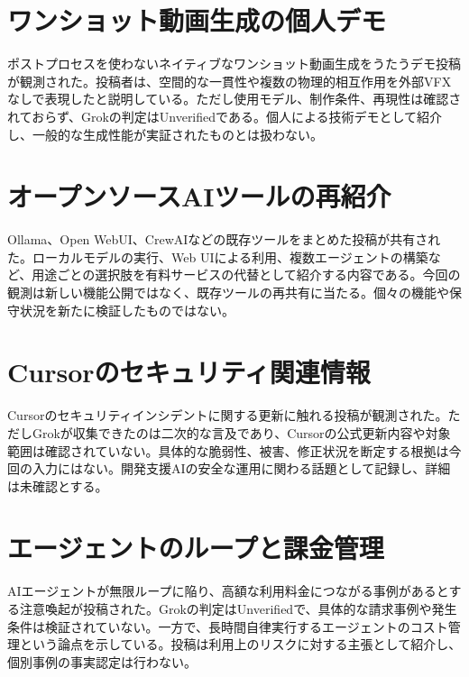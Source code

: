 \section{ワンショット動画生成の個人デモ}
ポストプロセスを使わないネイティブなワンショット動画生成をうたうデモ投稿が観測された。投稿者は、空間的な一貫性や複数の物理的相互作用を外部VFXなしで表現したと説明している。ただし使用モデル、制作条件、再現性は確認されておらず、Grokの判定はUnverifiedである。個人による技術デモとして紹介し、一般的な生成性能が実証されたものとは扱わない。

\section{オープンソースAIツールの再紹介}
Ollama、Open WebUI、CrewAIなどの既存ツールをまとめた投稿が共有された。ローカルモデルの実行、Web UIによる利用、複数エージェントの構築など、用途ごとの選択肢を有料サービスの代替として紹介する内容である。今回の観測は新しい機能公開ではなく、既存ツールの再共有に当たる。個々の機能や保守状況を新たに検証したものではない。

\section{Cursorのセキュリティ関連情報}
Cursorのセキュリティインシデントに関する更新に触れる投稿が観測された。ただしGrokが収集できたのは二次的な言及であり、Cursorの公式更新内容や対象範囲は確認されていない。具体的な脆弱性、被害、修正状況を断定する根拠は今回の入力にはない。開発支援AIの安全な運用に関わる話題として記録し、詳細は未確認とする。

\section{エージェントのループと課金管理}
AIエージェントが無限ループに陥り、高額な利用料金につながる事例があるとする注意喚起が投稿された。Grokの判定はUnverifiedで、具体的な請求事例や発生条件は検証されていない。一方で、長時間自律実行するエージェントのコスト管理という論点を示している。投稿は利用上のリスクに対する主張として紹介し、個別事例の事実認定は行わない。
